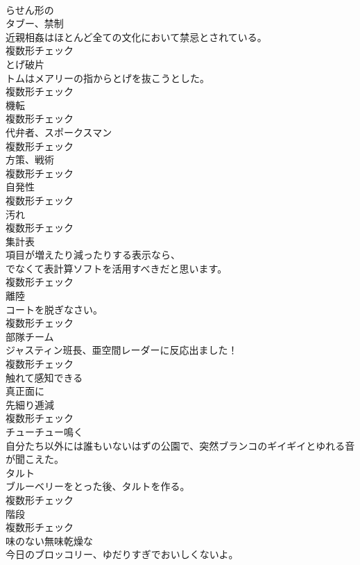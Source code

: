 \documentclass[8pt]{extreport}
\begin{document}
\begin{CJK}{UTF8}{min}
\\	[形容詞]	らせん形の	
\\	[名詞]	タブー、禁制	
\\	近親相姦はほとんど全ての文化において禁忌とされている。	
\\	複数形チェック
\\	[名詞]	とげ破片	
\\	トムはメアリーの指からとげを抜こうとした。	
\\	複数形チェック
\\	[名詞]	機転	
\\	複数形チェック
\\	[名詞]	代弁者、スポークスマン	
\\	複数形チェック
\\	[名詞]	方策、戦術	
\\	複数形チェック
\\	[名詞]	自発性	
\\	複数形チェック
\\	[名詞]	汚れ	
\\	複数形チェック
\\	[名詞]	集計表	
\\	項目が増えたり減ったりする表示なら、
\\	でなくて表計算ソフトを活用すべきだと思います。	
\\	複数形チェック
\\	[名詞]	離陸	
\\	コートを脱ぎなさい。	
\\	複数形チェック
\\	[名詞]	部隊チーム	
\\	ジャスティン班長、亜空間レーダーに反応出ました！	
\\	複数形チェック
\\	[形容詞]	触れて感知できる	
\\	[副詞]	真正面に	
\\	[名詞]	先細り逓減	
\\	複数形チェック
\\	[動詞]	チューチュー鳴く	
\\	自分たち以外には誰もいないはずの公園で、突然ブランコのギイギイとゆれる音が聞こえた。	
\\	[名詞]	タルト	
\\	ブルーベリーをとった後、タルトを作る。	
\\	複数形チェック
\\	[名詞]	階段	
\\	複数形チェック
\\	[形容詞]	味のない無味乾燥な	
\\	今日のブロッコリー、ゆだりすぎでおいしくないよ。	

\end{CJK}
\end{document}
